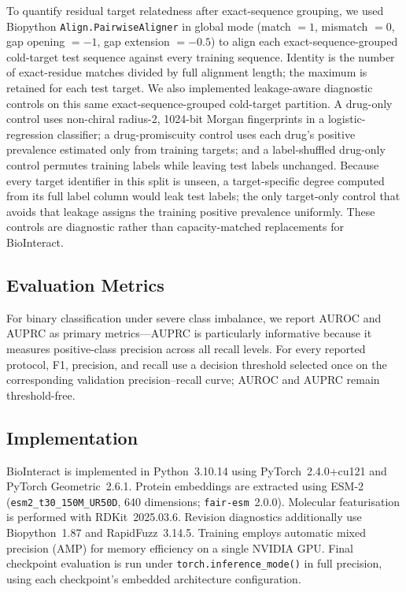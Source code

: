 \documentclass[fleqn,10pt]{wlscirep}
\begin{document}
To quantify residual target relatedness after exact-sequence grouping, we used
Biopython \texttt{Align.PairwiseAligner} in global mode (match $=1$, mismatch
$=0$, gap opening $=-1$, gap extension $=-0.5$) to align each
exact-sequence-grouped cold-target
test sequence against every training sequence. Identity is the number of
exact-residue matches divided by full alignment length; the maximum is retained
for each test target. We also implemented leakage-aware diagnostic controls on
this same exact-sequence-grouped cold-target partition. A drug-only control uses non-chiral
radius-2, 1024-bit
Morgan fingerprints in a logistic-regression classifier; a drug-promiscuity
control uses each drug's positive prevalence estimated only from training
targets; and a label-shuffled drug-only control permutes training labels while
leaving test labels unchanged.  Because every target identifier in this split
is unseen, a target-specific degree computed from its full label column would
leak test labels; the only target-only control that avoids that leakage assigns
the training positive prevalence uniformly.  These controls are diagnostic
rather than capacity-matched replacements for BioInteract.

\subsection{Evaluation Metrics}

For binary classification under severe class imbalance, we report AUROC and
AUPRC as primary metrics---AUPRC is particularly informative because it measures
positive-class precision across all recall levels. For every reported protocol,
F1, precision, and recall use a decision threshold selected once on the
corresponding validation precision--recall curve; AUROC and AUPRC remain
threshold-free.

\subsection{Implementation}

BioInteract is implemented in Python~3.10.14 using PyTorch~2.4.0+cu121 and
PyTorch Geometric~2.6.1.\cite{fey2019fast} Protein embeddings are extracted using
ESM-2\cite{lin2023evolutionary} (\texttt{esm2\_t30\_150M\_UR50D}, 640
dimensions; \texttt{fair-esm}~2.0.0). Molecular featurisation is performed with
RDKit~2025.03.6.\cite{rdkit} Revision diagnostics additionally use
Biopython~1.87 and RapidFuzz~3.14.5. Training employs automatic mixed precision (AMP) for
memory efficiency on a single NVIDIA GPU. Final checkpoint evaluation is run
under \texttt{torch.inference\_mode()} in full precision, using each checkpoint's
embedded architecture configuration.
\end{document}
